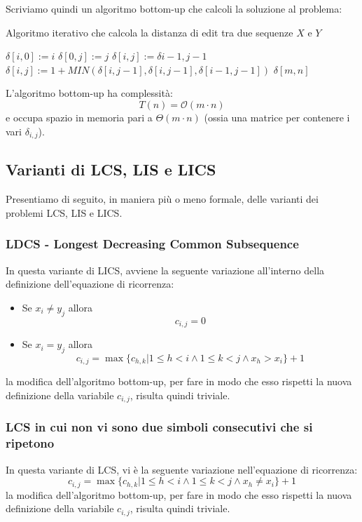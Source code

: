 \documentclass[12pt]{article}
\begin{document}
Scriviamo quindi un algoritmo bottom-up che calcoli la soluzione al problema: \newline
\begin{algorithm}[H]
    \caption{Algoritmo iterativo che calcola la distanza di edit tra due sequenze $X$ e $Y$}
    \DontPrintSemicolon
     {
         {
            $\delta[i,0] := i$
        }
         {
            $\delta[0, j] := j$
        }
         {
             {
                 {
                    $\delta[i,j] := \delta{i-1, j-1}$
                } {
                    $\delta[i,j] := 1 + MIN(\delta[i,j-1], \delta[i, j-1], \delta[i-1,j-1])$
                }
            }
        }
        \Return $\delta[m,n]$
    }
\end{algorithm} \noindent
L'algoritmo bottom-up ha complessità:
$$T(n) = \mathcal{O}(m \cdot n)$$
e occupa spazio in memoria pari a $\Theta(m \cdot n)$ (ossia una matrice per contenere i vari $\delta_{i,j}$).
\subsection{Varianti di LCS, LIS e LICS}
Presentiamo di seguito, in maniera più o meno formale, delle varianti dei problemi LCS, LIS e LICS.
\subsubsection{LDCS - Longest Decreasing Common Subsequence}
In questa variante di LICS, avviene la seguente variazione all'interno della definizione dell'equazione di ricorrenza:
\begin{itemize}
    \item Se $x_i \neq y_j$ allora
    $$c_{i,j} = 0$$
    \item Se $x_i = y_j$ allora
    $$c_{i,j} = \max\{c_{h,k}|1 \leq h < i \land 1 \leq k < j \land x_h > x_i\} + 1$$
\end{itemize}
la modifica dell'algoritmo bottom-up, per fare in modo che esso rispetti la nuova definizione della variabile $c_{i,j}$, risulta quindi triviale.
\subsubsection{LCS in cui non vi sono due simboli consecutivi che si ripetono}
In questa variante di LCS, vi è la seguente variazione nell'equazione di ricorrenza:
$$c_{i,j} = \max\{c_{h,k}|1 \leq h < i \land 1 \leq k < j \land x_h \neq x_i\} + 1$$
la modifica dell'algoritmo bottom-up, per fare in modo che esso rispetti la nuova definizione della variabile $c_{i,j}$, risulta quindi triviale.
\end{document}
